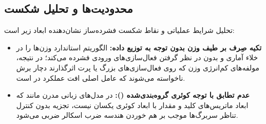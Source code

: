 \subsection{محدودیت‌ها و تحلیل شکست}
تحلیل شرایط عملیاتی و نقاط شکست فشرده‌ساز  نشان‌دهنده ابعاد زیر است:
\begin{itemize}
    \item \textbf{تکیه صِرف بر طیف وزن بدون توجه به توزیع داده:} الگوریتم  استاندارد وزن‌ها را در خلاء آماری و بدون در نظر گرفتن فعال‌سازی‌های ورودی فشرده می‌کند؛ در نتیجه، مولفه‌های کم‌انرژی وزن که روی فعال‌سازی‌های بزرگ یا پرت اثرگذارند دچار برش ناخواسته می‌شوند که عامل اصلی افت عملکرد در  است.
    \item \textbf{عدم تطابق با توجه کوئری گروه‌بندی‌شده ():} در مدل‌های زبانی مدرن مانند  که ابعاد ماتریس‌های کلید و مقدار با ابعاد کوئری یکسان نیست، تجزیه بدون کنترل تناظر سربرگ‌ها موجب بر هم خوردن هندسه ضرب اسکالر ضربی می‌شود.
\end{itemize}
